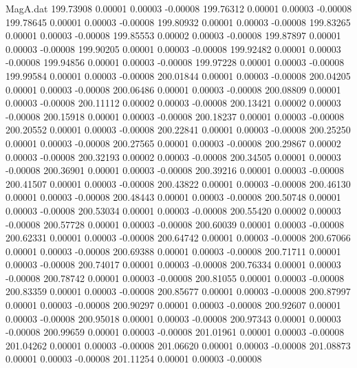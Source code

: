 \begin{filecontents}{MagA.dat}
 199.73908    0.00001    0.00003   -0.00008
 199.76312    0.00001    0.00003   -0.00008
 199.78645    0.00001    0.00003   -0.00008
 199.80932    0.00001    0.00003   -0.00008
 199.83265    0.00001    0.00003   -0.00008
 199.85553    0.00002    0.00003   -0.00008
 199.87897    0.00001    0.00003   -0.00008
 199.90205    0.00001    0.00003   -0.00008
 199.92482    0.00001    0.00003   -0.00008
 199.94856    0.00001    0.00003   -0.00008
 199.97228    0.00001    0.00003   -0.00008
 199.99584    0.00001    0.00003   -0.00008
 200.01844    0.00001    0.00003   -0.00008
 200.04205    0.00001    0.00003   -0.00008
 200.06486    0.00001    0.00003   -0.00008
 200.08809    0.00001    0.00003   -0.00008
 200.11112    0.00002    0.00003   -0.00008
 200.13421    0.00002    0.00003   -0.00008
 200.15918    0.00001    0.00003   -0.00008
 200.18237    0.00001    0.00003   -0.00008
 200.20552    0.00001    0.00003   -0.00008
 200.22841    0.00001    0.00003   -0.00008
 200.25250    0.00001    0.00003   -0.00008
 200.27565    0.00001    0.00003   -0.00008
 200.29867    0.00002    0.00003   -0.00008
 200.32193    0.00002    0.00003   -0.00008
 200.34505    0.00001    0.00003   -0.00008
 200.36901    0.00001    0.00003   -0.00008
 200.39216    0.00001    0.00003   -0.00008
 200.41507    0.00001    0.00003   -0.00008
 200.43822    0.00001    0.00003   -0.00008
 200.46130    0.00001    0.00003   -0.00008
 200.48443    0.00001    0.00003   -0.00008
 200.50748    0.00001    0.00003   -0.00008
 200.53034    0.00001    0.00003   -0.00008
 200.55420    0.00002    0.00003   -0.00008
 200.57728    0.00001    0.00003   -0.00008
 200.60039    0.00001    0.00003   -0.00008
 200.62331    0.00001    0.00003   -0.00008
 200.64742    0.00001    0.00003   -0.00008
 200.67066    0.00001    0.00003   -0.00008
 200.69388    0.00001    0.00003   -0.00008
 200.71711    0.00001    0.00003   -0.00008
 200.74017    0.00001    0.00003   -0.00008
 200.76334    0.00001    0.00003   -0.00008
 200.78742    0.00001    0.00003   -0.00008
 200.81055    0.00001    0.00003   -0.00008
 200.83359    0.00001    0.00003   -0.00008
 200.85677    0.00001    0.00003   -0.00008
 200.87997    0.00001    0.00003   -0.00008
 200.90297    0.00001    0.00003   -0.00008
 200.92607    0.00001    0.00003   -0.00008
 200.95018    0.00001    0.00003   -0.00008
 200.97343    0.00001    0.00003   -0.00008
 200.99659    0.00001    0.00003   -0.00008
 201.01961    0.00001    0.00003   -0.00008
 201.04262    0.00001    0.00003   -0.00008
 201.06620    0.00001    0.00003   -0.00008
 201.08873    0.00001    0.00003   -0.00008
 201.11254    0.00001    0.00003   -0.00008

\end{filecontents}
